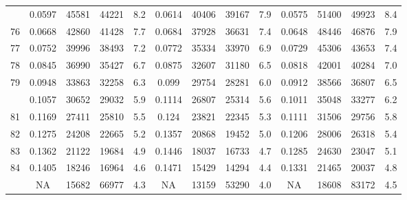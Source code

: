 \documentclass[
  14pt,
]{article}
\begin{document}
\begin{longtable}[t]{lcccccccccccc}
\addlinespace
75 & 0.0597 & 45581 & 44221 & 8.2 & 0.0614 & 40406 & 39167 & 7.9 & 0.0575 & 51400 & 49923 & 8.4\\
76 & 0.0668 & 42860 & 41428 & 7.7 & 0.0684 & 37928 & 36631 & 7.4 & 0.0648 & 48446 & 46876 & 7.9\\
77 & 0.0752 & 39996 & 38493 & 7.2 & 0.0772 & 35334 & 33970 & 6.9 & 0.0729 & 45306 & 43653 & 7.4\\
78 & 0.0845 & 36990 & 35427 & 6.7 & 0.0875 & 32607 & 31180 & 6.5 & 0.0818 & 42001 & 40284 & 7.0\\
79 & 0.0948 & 33863 & 32258 & 6.3 & 0.099 & 29754 & 28281 & 6.0 & 0.0912 & 38566 & 36807 & 6.5\\
\addlinespace
80 & 0.1057 & 30652 & 29032 & 5.9 & 0.1114 & 26807 & 25314 & 5.6 & 0.1011 & 35048 & 33277 & 6.2\\
81 & 0.1169 & 27411 & 25810 & 5.5 & 0.124 & 23821 & 22345 & 5.3 & 0.1111 & 31506 & 29756 & 5.8\\
82 & 0.1275 & 24208 & 22665 & 5.2 & 0.1357 & 20868 & 19452 & 5.0 & 0.1206 & 28006 & 26318 & 5.4\\
83 & 0.1362 & 21122 & 19684 & 4.9 & 0.1446 & 18037 & 16733 & 4.7 & 0.1285 & 24630 & 23047 & 5.1\\
84 & 0.1405 & 18246 & 16964 & 4.6 & 0.1471 & 15429 & 14294 & 4.4 & 0.1331 & 21465 & 20037 & 4.8\\
\addlinespace
85 & NA & 15682 & 66977 & 4.3 & NA & 13159 & 53290 & 4.0 & NA & 18608 & 83172 & 4.5\\*
\end{longtable}
\end{document}

